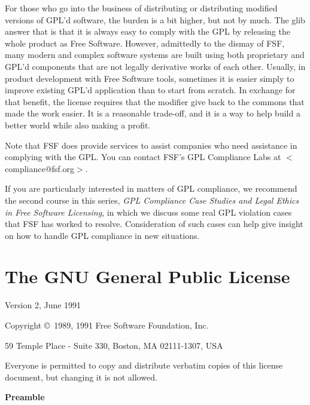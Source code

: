 \documentclass[12pt]{report}
\begin{document}
For those who go into the business of distributing or distributing
modified versions of GPL'd software, the burden is a bit higher, but not
by much.  The glib answer that is that it is always easy to comply with
the GPL by releasing the whole product as Free Software.  However,
admittedly to the dismay of FSF, many modern and complex software systems
are built using both proprietary and GPL'd components that are not
legally derivative works of each other.  Usually, in product development
with Free Software tools, sometimes it is easier simply to improve
existing GPL'd application than to start from scratch.  In exchange for
that benefit, the license requires that the modifier give back to the
commons that made the work easier.  It is a reasonable trade-off, and it
is a way to help build a better world while also making a profit.

Note that FSF does provide services to assist companies who need
assistance in complying with the GPL.  You can contact FSF's GPL
Compliance Labs at $<$compliance@fsf.org$>$.

If you are particularly interested in matters of GPL compliance, we
recommend the second course in this series, {\em GPL Compliance Case
  Studies and Legal Ethics in Free Software Licensing\/}, in which we
discuss some real GPL violation cases that FSF has worked to resolve.
Consideration of such cases can help give insight on how to handle GPL
compliance in new situations.

\appendix

\chapter{The GNU General Public License}

\begin{center}
{\parindent 0in

Version 2, June 1991

Copyright \copyright\ 1989, 1991 Free Software Foundation, Inc.

\bigskip

59 Temple Place - Suite 330, Boston, MA  02111-1307, USA

\bigskip

Everyone is permitted to copy and distribute verbatim copies
of this license document, but changing it is not allowed.
}
\end{center}

\begin{center}
{\bf\large Preamble}
\end{center}
\end{document}
